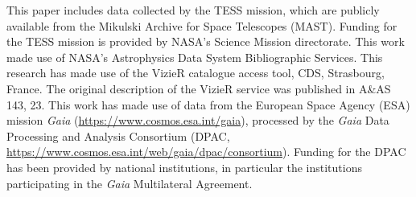 \documentclass[RNAAS]{aastex62}
\begin{document}

\acknowledgements
%
This paper includes data collected by the TESS mission, which are
publicly available from the Mikulski Archive for Space Telescopes
(MAST).
%
Funding for the TESS mission is provided by NASA's Science Mission
directorate.
%
This work made use of NASA's Astrophysics Data System Bibliographic
Services.
%
This research has made use of the VizieR catalogue access tool, CDS,
Strasbourg, France. The original description of the VizieR service was
published in A\&AS 143, 23.
%
This work has made use of data from the European Space Agency (ESA)
mission {\it Gaia} (\url{https://www.cosmos.esa.int/gaia}), processed
by the {\it Gaia} Data Processing and Analysis Consortium (DPAC,
\url{https://www.cosmos.esa.int/web/gaia/dpac/consortium}). Funding
for the DPAC has been provided by national institutions, in particular
the institutions participating in the {\it Gaia} Multilateral
Agreement.
%
\newline
%

                            
 
\end{document}
